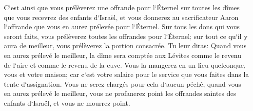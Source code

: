 \verse C`est ainsi que vous prélèverez une offrande pour l`Éternel sur toutes les dîmes que vous recevrez des enfants d`Israël, et vous donnerez au sacrificateur Aaron l`offrande que vous en aurez prélevée pour l`Éternel. 
\verse Sur tous les dons qui vous seront faits, vous prélèverez toutes les offrandes pour l`Éternel; sur tout ce qu`il y aura de meilleur, vous prélèverez la portion consacrée. 
\verse Tu leur diras: Quand vous en aurez prélevé le meilleur, la dîme sera comptée aux Lévites comme le revenu de l`aire et comme le revenu de la cuve. 
\verse Vous la mangerez en un lieu quelconque, vous et votre maison; car c`est votre salaire pour le service que vous faites dans la tente d`assignation. 
\verse Vous ne serez chargés pour cela d`aucun péché, quand vous en aurez prélevé le meilleur, vous ne profanerez point les offrandes saintes des enfants d`Israël, et vous ne mourrez point. 

